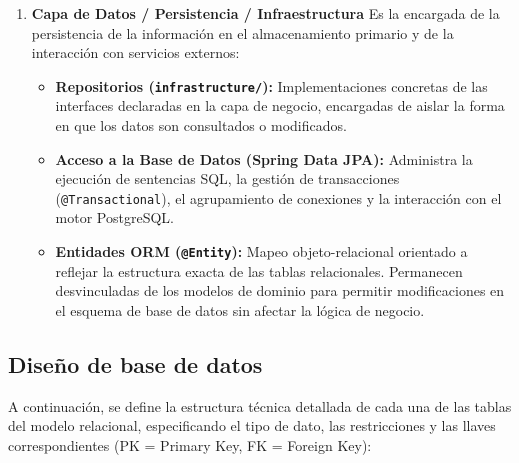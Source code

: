 \documentclass[12pt, atypical, journal]{article}
\begin{document}
\begin{enumerate}
	\item \textbf{Capa de Datos / Persistencia / Infraestructura} 
	Es la encargada de la persistencia de la información en el almacenamiento primario y de la interacción con servicios externos:
	\begin{itemize}
		\item \textbf{Repositorios (\texttt{infrastructure/}):} Implementaciones concretas de las interfaces declaradas en la capa de negocio, encargadas de aislar la forma en que los datos son consultados o modificados.
		\item \textbf{Acceso a la Base de Datos (Spring Data JPA):} Administra la ejecución de sentencias SQL, la gestión de transacciones (\texttt{@Transactional}), el agrupamiento de conexiones y la interacción con el motor PostgreSQL.
		\item \textbf{Entidades ORM (\texttt{@Entity}):} Mapeo objeto-relacional orientado a reflejar la estructura exacta de las tablas relacionales. Permanecen desvinculadas de los modelos de dominio para permitir modificaciones en el esquema de base de datos sin afectar la lógica de negocio.
	\end{itemize}
\end{enumerate}

\subsection{Diseño de base de datos}
A continuación, se define la estructura técnica detallada de cada una de las tablas del modelo relacional, especificando el tipo de dato, las restricciones y las llaves correspondientes (PK = Primary Key, FK = Foreign Key):
\end{document}
